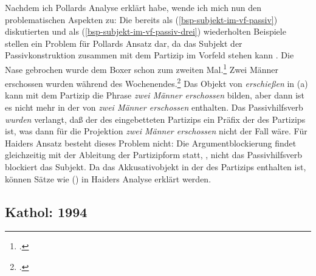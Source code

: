 {Nachdem ich Pollards Analyse erklärt habe, wende ich mich nun den problematischen
Aspekten zu: Die bereits als (\ref{bsp-subjekt-im-vf-passiv}) diskutierten und als
(\ref{bsp-subjekt-im-vf-passiv-drei}) wiederholten Beispiele stellen ein Problem
für Pollards Ansatz dar, da das Subjekt der Passivkonstruktion
zusammen mit dem Partizip im Vorfeld stehen kann \citep[]{Mueller99a}.
\eal
\label{bsp-subjekt-im-vf-passiv-drei}
\ex{}
Die Nase gebrochen wurde dem Boxer schon zum zweiten Mal.\footnote{
        .
}
\ex{}
Zwei Männer erschossen wurden    während des Wochenendes.\footnote{
        .%
        }
\label{bsp-subjekt-im-vf-passiv-letzt-drei}
\zl
Das Objekt von \emph{erschießen} in (a) kann mit dem Partizip die Phrase
\emph{zwei Männer erschossen} bilden, aber dann ist es nicht mehr in der \subcatl von
\emph{zwei Männer erschossen} enthalten. Das Passivhilfsverb \emph{wurden} verlangt,
daß der \ergw des eingebetteten Partizips ein Präfix der \subcatl des Partizips ist,
was dann für die Projektion \emph{zwei Männer erschossen} nicht der Fall wäre.
Für Haiders Ansatz besteht dieses Problem nicht: Die Argumentblockierung
findet gleichzeitig mit der Ableitung der Partizipform statt, \dash, nicht das Passivhilfsverb
blockiert das Subjekt. Da das Akkusativobjekt in der \subcatl des Partizips enthalten
ist, können Sätze wie () in Haiders Analyse erklärt werden.


\subsection{Kathol: 1994}
\label{sec-kathol-passive-raising}

}
